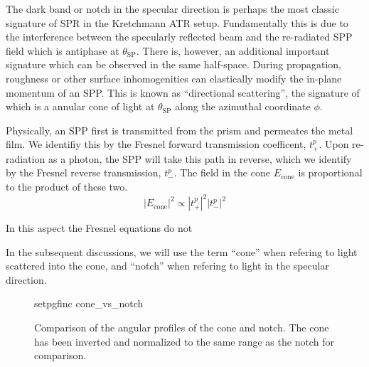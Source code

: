The dark band or notch in the specular direction is perhaps the most
classic signature of SPR in the Kretchmann ATR setup.  Fundamentally this
is due to the interference between the specularly reflected beam and the
re-radiated SPP field which is antiphase at $\theta_\mathrm{SP}$.  There
is, however, an additional important signature which can be observed in the
same half-space.  During propagation, roughness or other surface
inhomogenities can elastically modify the in-plane momentum of an SPP.
This is known as ``directional scattering'', the signature of which is a
annular cone of light at $\theta_\mathrm{SP}$ along the azimuthal
coordinate $\phi$.

Physically, an SPP first is transmitted from the prism and permeates the
metal film.  We identifiy this by the Fresnel forward transmission
coefficent, $t^p_+$.  Upon re-radiation as a photon, the SPP will take this
path in reverse, which we identify by the Fresnel reverse transmission,
$t^p_-$.  The field in the cone $E_\mathrm{cone}$ is proportional to the
product of these two.
\begin{equation}
|E_\mathrm{cone}|^2 \propto	|t^p_+|^2 |t^p_-|^2
\end{equation}

In this aspect the Fresnel equations do not 

In the subsequent discussions, we will use the term ``cone'' when refering
to light scattered into the cone, and ``notch'' when refering to light in
the specular direction.

\begin{figure}[ht]
 \centering
 {setpgfinc}
 {cone_vs_notch}
 \caption{Comparison of the angular profiles of the cone and notch.  The
	cone has been inverted and normalized to the same range as the notch for
	comparison.}
 \label{fig:conevsnotch}
\end{figure}



